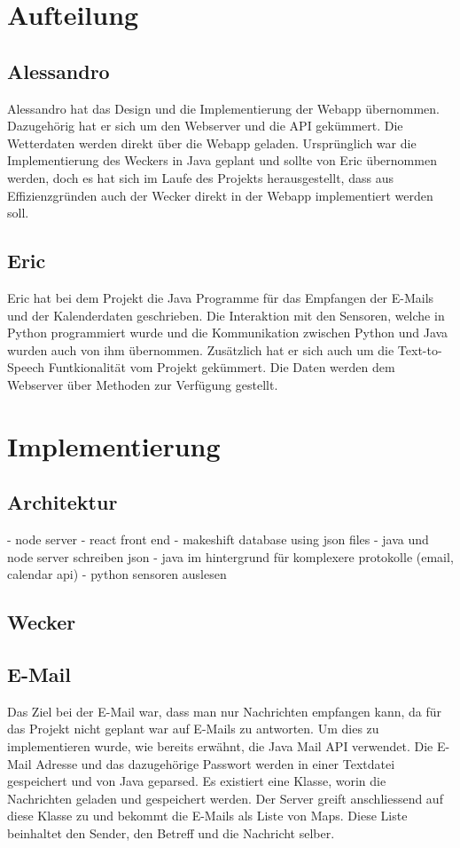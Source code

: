 \documentclass[11pt,a4paper]{article}
\begin{document}
\section{Aufteilung}
\subsection{Alessandro}
Alessandro hat das Design und die Implementierung der Webapp übernommen. Dazugehörig hat er sich um den Webserver und die API gekümmert. Die Wetterdaten werden direkt über die Webapp geladen. Ursprünglich war die Implementierung des Weckers in Java geplant und sollte von Eric übernommen werden, doch es hat sich im Laufe des Projekts herausgestellt, dass aus Effizienzgründen auch der Wecker direkt in der Webapp implementiert werden soll.

\subsection{Eric}
Eric hat bei dem Projekt die Java Programme für das Empfangen der E-Mails und der Kalenderdaten geschrieben. Die Interaktion mit den Sensoren, welche in Python programmiert wurde und die Kommunikation zwischen Python und Java wurden auch von ihm \"ubernommen. Zusätzlich hat er sich auch um die Text-to-Speech Funtkionalit\"at vom Projekt gek\"ummert. Die Daten werden dem Webserver über Methoden zur Verfügung gestellt.

\section{Implementierung}
\subsection{Architektur} %
- node server
- react front end
- makeshift database using json files
- java und node server schreiben json
- java im hintergrund für komplexere protokolle (email, calendar api)
- python sensoren auslesen

\subsection{Wecker}

\subsection{E-Mail}
Das Ziel bei der E-Mail war, dass man nur Nachrichten empfangen kann, da f\"ur das Projekt nicht geplant war auf E-Mails zu antworten. Um dies zu implementieren wurde, wie bereits erwähnt, die Java Mail API verwendet. Die E-Mail Adresse und das dazugehörige Passwort werden in einer Textdatei gespeichert und von Java geparsed. Es existiert eine Klasse, worin die Nachrichten geladen und gespeichert werden. Der Server greift anschliessend auf diese Klasse zu und bekommt die E-Mails als Liste von Maps. Diese Liste beinhaltet den Sender, den Betreff und die Nachricht selber.
\end{document}
